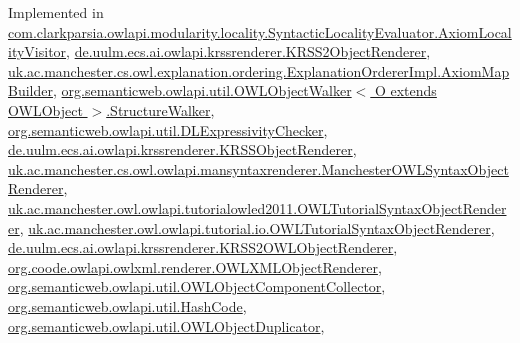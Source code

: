 Implemented in \hyperlink{classcom_1_1clarkparsia_1_1owlapi_1_1modularity_1_1locality_1_1_syntactic_locality_evaluator_1_1_axiom_locality_visitor_afe605ef730cf7edc41fb545d13f31975}{com.\-clarkparsia.\-owlapi.\-modularity.\-locality.\-Syntactic\-Locality\-Evaluator.\-Axiom\-Locality\-Visitor}, \hyperlink{classde_1_1uulm_1_1ecs_1_1ai_1_1owlapi_1_1krssrenderer_1_1_k_r_s_s2_object_renderer_ac965af26c7c52682cb9ef5ea9ac176ad}{de.\-uulm.\-ecs.\-ai.\-owlapi.\-krssrenderer.\-K\-R\-S\-S2\-Object\-Renderer}, \hyperlink{classuk_1_1ac_1_1manchester_1_1cs_1_1owl_1_1explanation_1_1ordering_1_1_explanation_orderer_impl_1_1_axiom_map_builder_a0fd8606a78de93bc4d8259c4906bbb2b}{uk.\-ac.\-manchester.\-cs.\-owl.\-explanation.\-ordering.\-Explanation\-Orderer\-Impl.\-Axiom\-Map\-Builder}, \hyperlink{classorg_1_1semanticweb_1_1owlapi_1_1util_1_1_o_w_l_object_walker_3_01_o_01extends_01_o_w_l_object_01_4_1_1_structure_walker_a0a59dc832d49171dec7bfb5ff60330af}{org.\-semanticweb.\-owlapi.\-util.\-O\-W\-L\-Object\-Walker$<$ O extends O\-W\-L\-Object $>$.\-Structure\-Walker}, \hyperlink{classorg_1_1semanticweb_1_1owlapi_1_1util_1_1_d_l_expressivity_checker_a0fdf5e1fea2152d2b758755f41d5295d}{org.\-semanticweb.\-owlapi.\-util.\-D\-L\-Expressivity\-Checker}, \hyperlink{classde_1_1uulm_1_1ecs_1_1ai_1_1owlapi_1_1krssrenderer_1_1_k_r_s_s_object_renderer_ae3a9b2259c1abb7658e731bc8e157060}{de.\-uulm.\-ecs.\-ai.\-owlapi.\-krssrenderer.\-K\-R\-S\-S\-Object\-Renderer}, \hyperlink{classuk_1_1ac_1_1manchester_1_1cs_1_1owl_1_1owlapi_1_1mansyntaxrenderer_1_1_manchester_o_w_l_syntax_object_renderer_ae22cb839c9ed25dc0c334e5c5ac5f646}{uk.\-ac.\-manchester.\-cs.\-owl.\-owlapi.\-mansyntaxrenderer.\-Manchester\-O\-W\-L\-Syntax\-Object\-Renderer}, \hyperlink{classuk_1_1ac_1_1manchester_1_1owl_1_1owlapi_1_1tutorialowled2011_1_1_o_w_l_tutorial_syntax_object_renderer_a661db3327b55a9b56ccb5e1d826ee00f}{uk.\-ac.\-manchester.\-owl.\-owlapi.\-tutorialowled2011.\-O\-W\-L\-Tutorial\-Syntax\-Object\-Renderer}, \hyperlink{classuk_1_1ac_1_1manchester_1_1owl_1_1owlapi_1_1tutorial_1_1io_1_1_o_w_l_tutorial_syntax_object_renderer_a6451d87f5f3665c058c99a4f98662554}{uk.\-ac.\-manchester.\-owl.\-owlapi.\-tutorial.\-io.\-O\-W\-L\-Tutorial\-Syntax\-Object\-Renderer}, \hyperlink{classde_1_1uulm_1_1ecs_1_1ai_1_1owlapi_1_1krssrenderer_1_1_k_r_s_s2_o_w_l_object_renderer_a430e4e686a3a79ce881909567539d84e}{de.\-uulm.\-ecs.\-ai.\-owlapi.\-krssrenderer.\-K\-R\-S\-S2\-O\-W\-L\-Object\-Renderer}, \hyperlink{classorg_1_1coode_1_1owlapi_1_1owlxml_1_1renderer_1_1_o_w_l_x_m_l_object_renderer_ab6ae547377d0fcfa08be3d7fee553cf4}{org.\-coode.\-owlapi.\-owlxml.\-renderer.\-O\-W\-L\-X\-M\-L\-Object\-Renderer}, \hyperlink{classorg_1_1semanticweb_1_1owlapi_1_1util_1_1_o_w_l_object_component_collector_a7de878e99607633242bf1e492f52df56}{org.\-semanticweb.\-owlapi.\-util.\-O\-W\-L\-Object\-Component\-Collector}, \hyperlink{classorg_1_1semanticweb_1_1owlapi_1_1util_1_1_hash_code_ae7f26c0325e2dcbebd0389c43d911fa9}{org.\-semanticweb.\-owlapi.\-util.\-Hash\-Code}, \hyperlink{classorg_1_1semanticweb_1_1owlapi_1_1util_1_1_o_w_l_object_duplicator_ada463f1a771c13bcbee2724db3b002c5}{org.\-semanticweb.\-owlapi.\-util.\-O\-W\-L\-Object\-Duplicator}, 